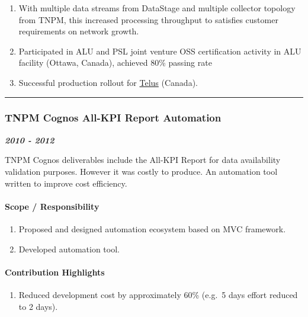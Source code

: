 \documentclass[
]{article}
\providecommand{\tightlist}{%
  \setlength{\itemsep}{0pt}\setlength{\parskip}{0pt}}
\begin{document}
\begin{enumerate}
\def\labelenumi{\arabic{enumi}.}
\tightlist
\item
  With multiple data streams from DataStage and multiple collector
  topology from TNPM, this increased processing throughput to satisfies
  customer requirements on network growth.
\item
  Participated in ALU and PSL joint venture OSS certification activity
  in ALU facility (Ottawa, Canada), achieved 80\% passing rate
\item
  Successful production rollout for \href{http://www.telus.com}{Telus}
  (Canada).
\end{enumerate}

\begin{center}\rule{0.5\linewidth}{0.5pt}\end{center}

\hypertarget{tnpm-cognos-all-kpi-report-automation}{%
\subsubsection{TNPM Cognos All-KPI Report
Automation}\label{tnpm-cognos-all-kpi-report-automation}}

\textbf{\emph{2010 - 2012}}

TNPM Cognos deliverables include the All-KPI Report for data
availability validation purposes. However it was costly to produce. An
automation tool written to improve cost efficiency.

\hypertarget{scope-responsibility-12}{%
\paragraph{Scope / Responsibility}\label{scope-responsibility-12}}

\begin{enumerate}
\def\labelenumi{\arabic{enumi}.}
\tightlist
\item
  Proposed and designed automation ecosystem based on MVC framework.
\item
  Developed automation tool.
\end{enumerate}

\hypertarget{contribution-highlights-12}{%
\paragraph{Contribution Highlights}\label{contribution-highlights-12}}

\begin{enumerate}
\def\labelenumi{\arabic{enumi}.}
\tightlist
\item
  Reduced development cost by approximately 60\% (e.g.~5 days effort
  reduced to 2 days).
\end{enumerate}
\end{document}
